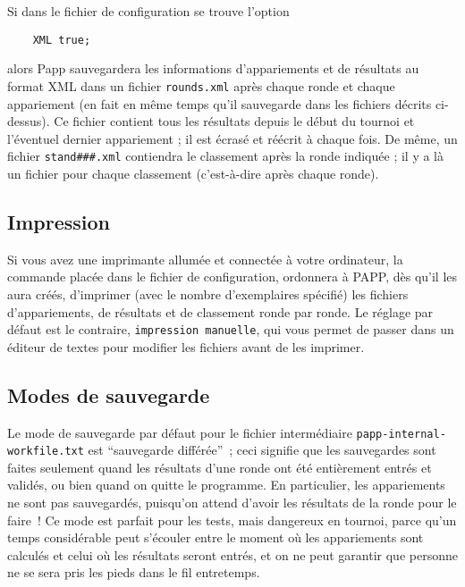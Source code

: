 \documentclass[10pt]{article}
\begin{document}
Si dans le fichier de configuration se trouve l'option
\begin{verbatim}
    XML true;
\end{verbatim}
alors Papp sauvegardera les informations d'appariements et de résultats au format XML dans un fichier \verb|rounds.xml| après chaque ronde et chaque appariement (en fait en même temps qu'il sauvegarde dans les fichiers décrits ci-dessus). Ce fichier contient tous les résultats depuis le début du tournoi et l'éventuel dernier appariement ; il est écrasé et réécrit à chaque fois. De même, un fichier \verb|stand###.xml| contiendra le classement après la ronde indiquée ; il y a là  un fichier pour chaque classement (c'est-à-dire après chaque ronde).

\subsection{Impression}

Si vous avez une imprimante allumée et connectée à votre ordinateur, la 
commande 
\medbreak
{}
\medbreak
\noindent placée dans le fichier de configuration, ordonnera à PAPP, dès 
qu'il les aura créés, d'imprimer (avec le nombre d'exemplaires 
spécifié) les fichiers d'appariements, de résultats et de 
classement ronde par ronde.  Le réglage par défaut est le 
contraire, \verb|impression manuelle|, qui vous permet de passer dans 
un éditeur de textes pour modifier les fichiers avant de les 
imprimer.

\subsection{Modes de sauvegarde}

Le mode de sauvegarde par défaut pour le fichier intermédiaire 
\verb|papp-internal-workfile.txt| est ``sauvegarde différée''~; ceci signifie que 
les sauvegardes sont faites seulement quand les résultats d'une 
ronde ont été entièrement entrés et validés, ou bien quand 
on quitte le programme.  En particulier, les appariements ne sont pas 
sauvegardés, puisqu'on attend d'avoir les résultats de la ronde 
pour le faire~!  Ce mode est parfait pour les tests, mais dangereux en 
tournoi, parce qu'un temps considérable peut s'écouler entre le 
moment o\`u les appariements sont calculés et celui o\`u les 
résultats seront entrés, et on ne peut garantir que personne ne se 
sera pris les pieds dans le fil entretemps.
\end{document}
